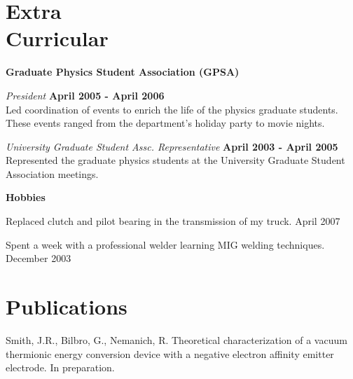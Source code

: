 \documentclass[letterpaper,margin,line]{res}
\begin{document}
\begin{resume}
\section{\sc Extra\\ Curricular}
{\bf Graduate Physics Student Association (GPSA)}

\vspace{-.3cm}
{\em President} \hfill {\bf April 2005 - April 2006} \\
Led coordination of events to enrich the life of the physics graduate students. These events ranged from the department's holiday party to movie nights.

\vspace{-.3cm}
{\em University Graduate Student Assc. Representative} \hfill {\bf April 2003 - April 2005}\\
Represented the graduate physics students at the University Graduate Student Association meetings.

{\bf Hobbies}

\vspace{-.3cm}
Replaced clutch and pilot bearing in the transmission of my truck. April 2007

\vspace{-.3cm}
Spent a week with a professional welder learning MIG welding techniques. December 2003


% 


\section{\sc Publications}
Smith, J.R., Bilbro, G., Nemanich, R. Theoretical characterization of a vacuum thermionic energy conversion device with a negative electron affinity emitter electrode. In preparation.


\end{resume}
\end{document}
